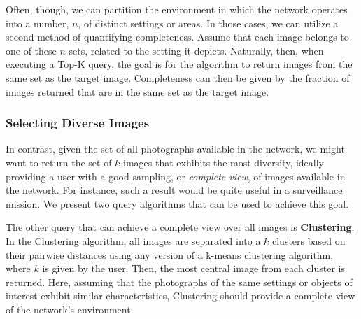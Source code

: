 Often, though, we can partition the environment in which the network operates into a number, $n$, of distinct settings or areas.  In those cases, we can utilize a second method of quantifying completeness.  Assume that each image belongs to one of these $n$ sets, %
related to the setting it depicts.  Naturally, then, when executing a Top-K query, the goal is for the algorithm to return images from the same set as the target image.  Completeness can then be given by the fraction of images returned that are in the same set as the target image.

\subsubsection{Selecting Diverse Images}

In contrast, given the set of all photographs available in the network, we might want to return the set of $k$ images that exhibits the most diversity, ideally providing a user with a good sampling, or \emph{complete view}, of images available in the network.  For instance, such a result would be quite useful in a surveillance mission.  We present two query algorithms that can be used to achieve this goal.


The other query that can achieve a complete view over all images is {\bf Clustering}.  In the Clustering algorithm, all images are separated into a $k$ clusters based on their pairwise distances using any version of a k-means clustering algorithm, where $k$ is given by the user.  Then, the most central image from each cluster is returned.  
Here, assuming that the photographs of the same settings or objects of interest exhibit similar characteristics, Clustering should provide a complete view of the network's environment.


